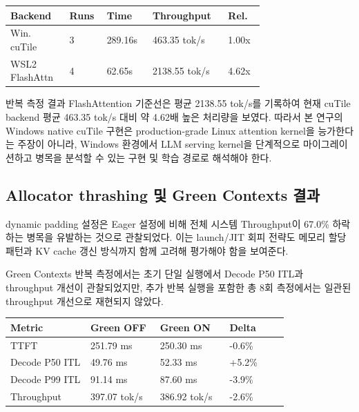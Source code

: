 \documentclass{kcc}            %
\begin{document}
\begin{table}[h]
\centering
\scriptsize
\setlength{\tabcolsep}{2pt}
\begin{tabular}{|p{0.18\linewidth}|p{0.08\linewidth}|p{0.15\linewidth}|p{0.20\linewidth}|p{0.12\linewidth}|}
\hline
\textbf{Backend} & \textbf{Runs} & \textbf{Time} & \textbf{Throughput} & \textbf{Rel.} \\ \hline
Win. cuTile & 3 & 289.16s & 463.35 tok/s & 1.00x \\ \hline
WSL2 FlashAttn & 4 & 62.65s & 2138.55 tok/s & 4.62x \\ \hline
\end{tabular}
\end{table}

반복 측정 결과 FlashAttention 기준선은 평균 2138.55 tok/s를 기록하여 현재
cuTile backend 평균 463.35 tok/s 대비 약 4.62배 높은 처리량을 보였다.
따라서 본 연구의 Windows native cuTile 구현은 production-grade Linux
attention kernel을 능가한다는 주장이 아니라, Windows 환경에서 LLM serving
kernel을 단계적으로 마이그레이션하고 병목을 분석할 수 있는 구현 및 학습
경로로 해석해야 한다.

\subsection{Allocator thrashing 및 Green Contexts 결과}
dynamic padding 설정은 Eager 설정에 비해 전체 시스템 Throughput이
67.0\% 하락하는 병목을 유발하는 것으로 관찰되었다. 이는 launch/JIT 회피
전략도 메모리 할당 패턴과 KV cache 갱신 방식까지 함께 고려해 평가해야
함을 보여준다.

Green Contexts 반복 측정에서는 초기 단일 실행에서 Decode P50 ITL과
throughput 개선이 관찰되었지만, 추가 반복 실행을 포함한 총 8회 측정에서는
일관된 throughput 개선으로 재현되지 않았다.

\begin{table}[h]
\centering
\scriptsize
\setlength{\tabcolsep}{2pt}
\begin{tabular}{|p{0.23\linewidth}|p{0.20\linewidth}|p{0.20\linewidth}|p{0.17\linewidth}|}
\hline
\textbf{Metric} & \textbf{Green OFF} & \textbf{Green ON} & \textbf{Delta} \\ \hline
TTFT & 251.79 ms & 250.30 ms & -0.6\% \\ \hline
Decode P50 ITL & 49.76 ms & 52.33 ms & +5.2\% \\ \hline
Decode P99 ITL & 91.14 ms & 87.60 ms & -3.9\% \\ \hline
Throughput & 397.07 tok/s & 386.92 tok/s & -2.6\% \\ \hline
\end{tabular}
\end{table}
\end{document}

